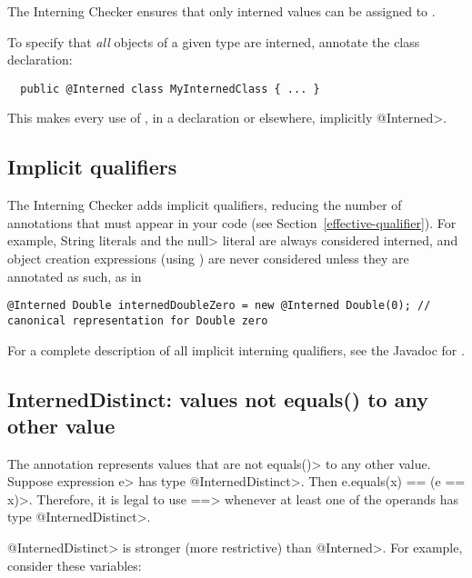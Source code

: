 The Interning Checker ensures that only interned
values can be assigned to .

To specify that \emph{all} objects of a given type are interned, annotate the
class declaration:

\begin{Verbatim}
  public @Interned class MyInternedClass { ... }
\end{Verbatim}

This makes every use of , in a
declaration or elsewhere, implicitly \<@Interned>.


\subsection{Implicit qualifiers\label{interning-implicit-qualifiers}}

The Interning Checker
adds implicit qualifiers, reducing the number of annotations that must
appear in your code (see Section~\ref{effective-qualifier}).
For example, String literals and the \<null> literal are always considered interned, and
object creation expressions (using ) are never considered
 unless they are annotated as such, as in

\begin{smaller}
\begin{Verbatim}
@Interned Double internedDoubleZero = new @Interned Double(0); // canonical representation for Double zero
\end{Verbatim}
\end{smaller}

For a complete description of all implicit interning qualifiers, see the
Javadoc for .


\subsection{InternedDistinct: values not equals() to any other value\label{interning-distinct}}

The  annotation
represents values that are not \<equals()> to any other value.  Suppose
expression \<e> has type \<@InternedDistinct>.  Then \<e.equals(x) == (e ==
x)>.  Therefore, it is legal to use \<==> whenever at least one of the
operands has type \<@InternedDistinct>.

\<@InternedDistinct> is stronger (more restrictive) than \<@Interned>.
For example, consider these variables:

